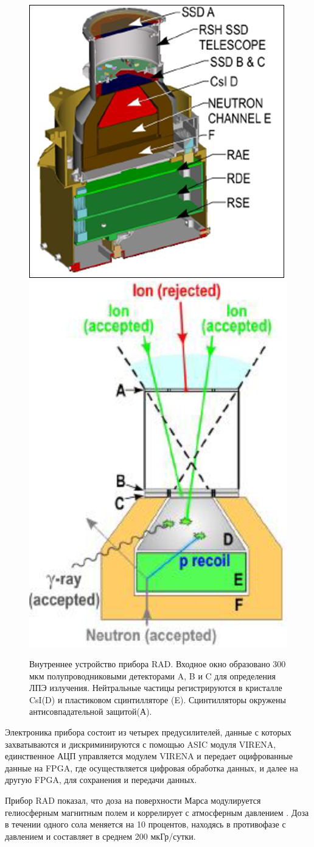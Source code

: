 \begin{figure}
	\centering
	\includegraphics[width=0.33\linewidth]{images/radmsl1}
	\includegraphics[width=0.30\linewidth]{images/radmsl}
	\caption[Внутреннее устройство прибора RAD.]{Внутреннее устройство прибора RAD. Входное окно образовано 300 мкм полупроводниковыми детекторами A, B и C для определения ЛПЭ излучения. Нейтральные частицы регистрируются в кристалле CsI(D) и пластиковом сцинтилляторе (E). Сцинтилляторы окружены антисовпадательной защитой(А).}
	\label{fig:radmsl}
\end{figure}

Электроника прибора состоит из четырех предусилителей, данные с которых захватываются и дискриминируются с помощью ASIC модуля VIRENA, единственное АЦП управляется модулем VIRENA и передает оцифрованные данные на FPGA, где осуществляется цифровая обработка данных, и далее на другую FPGA, для сохранения и передачи данных. 

Прибор RAD показал, что доза на поверхности Марса модулируется гелиосферным магнитным полем и коррелирует с атмосферным давлением \cite{Guo2017}. Доза в течении одного сола меняется на 10 процентов, находясь в противофазе с давлением и составляет в среднем 200 мкГр/сутки.


%
%
%
%

